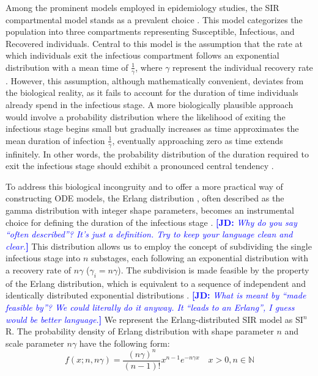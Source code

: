\documentclass[12pt]{article}
\newcommand{\comment}{}
\renewcommand{\comment}{\nocomment}
\renewcommand{\comment}{\showcomment}
\newcommand{\showcomment}[3]{\textcolor{#1}{\textbf{[#2: }\textsl{#3}\textbf{]}}}
\newcommand{\nocomment}[3]{}
\newcommand{\jd}[1]{\comment{blue}{JD}{#1}}
\begin{document}
Among the prominent models employed in epidemiology studies, the SIR compartmental model stands as a prevalent choice \cite{McKendrick1927}\cite{Anderson1991}. This model categorizes the population into three compartments representing Susceptible, Infectious, and Recovered individuals. Central to this model is the assumption that the rate at which individuals exit the infectious compartment follows an exponential distribution with a mean time of $\frac{1}{\gamma}$, where $\gamma$ represent the individual recovery rate \cite{Hethcote2000}. However, this assumption, although mathematically convenient, deviates from the biological reality, as it fails to account for the duration of time individuals already spend in the infectious stage. A more biologically plausible approach would involve a probability distribution where the likelihood of exiting the infectious stage begins small but gradually increases as time approximates the mean duration of infection $\frac{1}{\gamma}$, eventually approaching zero as time extends infinitely. In other words, the probability distribution of the duration required to exit the infectious stage should exhibit a pronounced central tendency \cite{Sartwell1950}\cite{Simpson1952}\cite{Bailey1954}\cite{Gough1977}.

To address this biological incongruity and to offer a more practical way of constructing ODE models, the Erlang distribution \cite{Anderson1980}\cite{Lloyd2001}\cite{Ma2006}, often described as the gamma distribution with integer shape parameters, becomes an instrumental choice for defining the duration of the infectious stage \cite{Olga2013}\cite{Nguyen2007}.
\jd{Why do you say “often described”? It's just a definition. Try to keep your language clean and clear.}
This distribution allows us to employ the concept of subdividing the single infectious stage into $n$ substages, each following an exponential distribution with a recovery rate of $n \gamma$ ($\gamma_i = n \gamma$). The subdivision is made feasible by the property of the Erlang distribution, which is equivalent to a sequence of independent and identically distributed exponential distributions \cite{Tummal2011}.
\jd{What is meant by “made feasible by”? We could literally do it anyway. It “leads to an Erlang”, I guess would be better language.}
We represent the Erlang-distributed SIR model as SI$^n$R. 
The probability density of Erlang distribution with shape parameter $n$ and scale parameter $n \gamma$ have the following form: 
\begin{equation*}
    f(x; n,n\gamma) = \frac{(n\gamma)^n}{(n-1)!} x^{n-1} e^{-n\gamma x} \quad x>0, n \in \mathbb{N}
\end{equation*}
\end{document}
